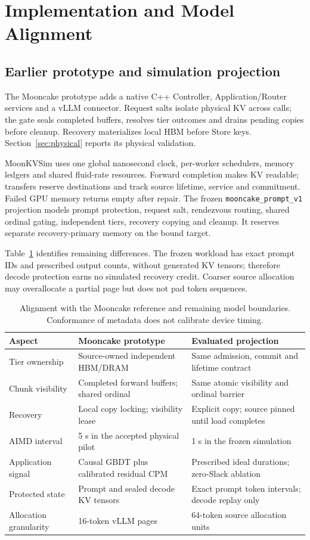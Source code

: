 \section{Implementation and Model Alignment}
\label{sec:implementation}
\subsection{Earlier prototype and simulation projection}
The Mooncake prototype adds a native C++ Controller, Application/Router
services and a vLLM connector. Request salts isolate physical KV across calls;
the gate seals completed buffers, resolves tier outcomes and drains pending
copies before cleanup. Recovery materializes local HBM before Store keys.
Section~\ref{sec:physical} reports its physical validation.

MoonKVSim uses one global nanosecond clock, per-worker schedulers, memory
ledgers and shared fluid-rate resources. Forward completion makes KV readable;
transfers reserve destinations and track source lifetime, service and commitment.
Failed GPU memory returns empty after repair. The frozen
\texttt{mooncake\_prompt\_v1} projection models prompt protection, request salt,
rendezvous routing, shared ordinal gating, independent tiers, recovery copying
and cleanup. It reserves separate recovery-primary memory on the bound target.

Table~\ref{tab:alignment} identifies remaining differences. The frozen workload
has exact prompt IDs and prescribed output counts, without generated KV tensors;
therefore decode protection earns no simulated recovery credit. Coarser source
allocation may overallocate a partial page but does not pad token sequences.

\begin{table}[t]
\centering
\caption{Alignment with the Mooncake reference and remaining model boundaries.
Conformance of metadata does not calibrate device timing.}
\label{tab:alignment}
\begin{tabular}{@{}p{}p{}p{}@{}}
\toprule
Aspect & Mooncake prototype & Evaluated projection \\
\midrule
Tier ownership & Source-owned independent HBM/DRAM & Same admission, commit and lifetime contract \\
Chunk visibility & Completed forward buffers; shared ordinal & Same atomic visibility and ordinal barrier \\
Recovery & Local copy locking; visibility lease & Explicit copy; source pinned until load completes \\
AIMD interval & 5 s in the accepted physical pilot & 1 s in the frozen simulation \\
Application signal & Causal GBDT plus calibrated residual CPM & Prescribed ideal durations; zero-Slack ablation \\
Protected state & Prompt and sealed decode KV tensors & Exact prompt token intervals; decode replay only \\
Allocation granularity & 16-token vLLM pages & 64-token source allocation units \\
\bottomrule
\end{tabular}
\end{table}

